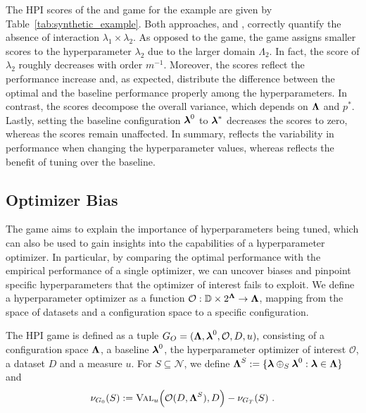\documentclass[letterpaper]{article} %
\newcommand{\tabref}[1]{Table~\ref{#1}}
\begin{document}
The HPI scores of the \sensitivity and \dstunability game for the example are given by \tabref{tab:synthetic_example}.
Both approaches, \sensitivity and \dstunability, correctly quantify the absence of interaction $\lambda_1 \times \lambda_2$.
As opposed to the \dstunability game, the \sensitivity game assigns smaller scores to the hyperparameter $\lambda_2$ due to the larger domain $\Lambda_2$. 
In fact, the \sensitivity score of $\lambda_2$ roughly decreases with order $m^{-1}$.
Moreover, the \dstunability scores reflect the performance increase and, as expected, distribute the difference between the optimal and the baseline performance properly among the hyperparameters.
In contrast, the \sensitivity scores decompose the overall variance, which depends on $\boldsymbol{\Lambda}$ and $p^*$.
Lastly, setting the baseline configuration $\boldsymbol{\lambda}^0$ to $\boldsymbol{\lambda}^\ast$ decreases the \dstunability scores to zero, whereas the \sensitivity scores remain unaffected.
In summary, \sensitivity reflects the variability %
in performance when changing the hyperparameter values, whereas \dstunability reflects the benefit of tuning over the baseline. 



\subsection{Optimizer Bias}\label{sec:opthabit}
The \dstunability game aims to explain the importance of hyperparameters being tuned, which can also be used to gain insights into the capabilities of a hyperparameter optimizer.
In particular, by comparing the optimal performance with the empirical performance of a single optimizer, we can uncover biases and pinpoint specific hyperparameters that the optimizer of interest fails to exploit.
We define a hyperparameter optimizer as a function $\mathcal{O}: \mathbb{D} \times 2^{\boldsymbol{\Lambda}} \rightarrow \boldsymbol{\Lambda}$, mapping from the space of datasets and a configuration space to a specific configuration. 

\begin{definition} \label{def:opthabit}
    The \opthabit HPI game is defined as a tuple $G_O = (\boldsymbol{\Lambda}, \boldsymbol{\lambda}^0, \mathcal{O}, D, u),$ consisting of a configuration space $\boldsymbol{\Lambda}$, a baseline $\boldsymbol{\lambda}^0$, the hyperparameter optimizer of interest $\mathcal O$, a dataset $D$ and a measure $u$.
    For $S \subseteq \mathcal N$, we define $\boldsymbol{\Lambda}^S := \{ \boldsymbol{\lambda} \oplus_S \boldsymbol{\lambda}^0: \boldsymbol{\lambda} \in \boldsymbol{\Lambda}\}$ and
        \begin{align*}
    \nu_{G_0}(S) := \textsc{Val}_u \Big(\mathcal{O}(D, \boldsymbol{\Lambda}^S), D \Big)
    - \nu_{G_T}(S) \,\, .
    \end{align*}
\end{definition}
\end{document}
